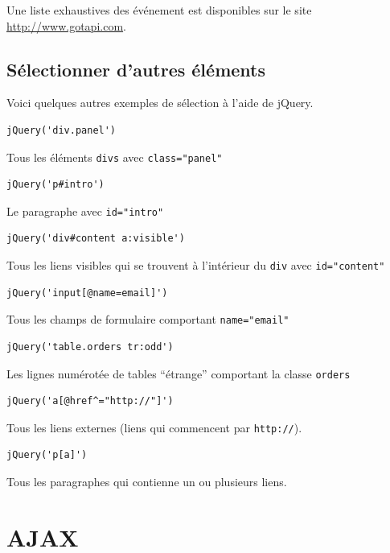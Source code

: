 \documentclass[10pt,a4paper,titlepage]{article}
\begin{document}
Une liste exhaustives des événement est disponibles sur le site \url{http://www.gotapi.com}.

\subsection{Sélectionner d'autres éléments}

Voici quelques autres exemples de sélection à l'aide de jQuery. 

\begin{lstlisting}
jQuery('div.panel')
\end{lstlisting}

Tous les éléments \texttt{divs} avec \texttt{class="panel"}

\begin{lstlisting}
jQuery('p#intro')
\end{lstlisting}

Le paragraphe avec \texttt{id="intro"}

\begin{lstlisting}
jQuery('div#content a:visible')
\end{lstlisting}

Tous les liens visibles qui se trouvent à l'intérieur du \texttt{div} avec \texttt{id="content"}

\begin{lstlisting}
jQuery('input[@name=email]')
\end{lstlisting}

Tous les champs de formulaire comportant \texttt{name="email"}

\begin{lstlisting}
jQuery('table.orders tr:odd')
\end{lstlisting}

Les lignes numérotée de tables “étrange” comportant la classe \texttt{orders}

\begin{lstlisting}
jQuery('a[@href^="http://"]')
\end{lstlisting}

Tous les liens externes (liens qui commencent par \verb!http://!).

\begin{lstlisting}
jQuery('p[a]')
\end{lstlisting}

Tous les paragraphes qui contienne un ou plusieurs liens.


\newpage
\section{AJAX}
\end{document}
